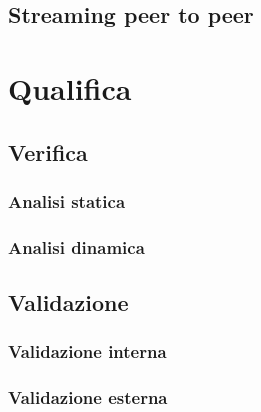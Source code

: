 	\subsection{Streaming peer to peer}

\section{Qualifica}
	\subsection{Verifica}
		\subsubsection{Analisi statica}
		\subsubsection{Analisi dinamica}
	\subsection{Validazione}
		\subsubsection{Validazione interna}
		\subsubsection{Validazione esterna}